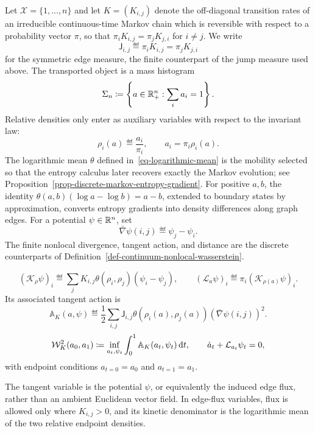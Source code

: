 Let \(\mathcal X=\{1,\ldots,n\}\) and let \(K=(K_{i,j})\) denote the off-diagonal transition rates of an irreducible continuous-time Markov chain which is reversible with respect to a probability vector \(\pi\), so that \(\pi_iK_{i,j}=\pi_jK_{j,i}\) for \(i\neq j\). We write
\[
	\mathsf J_{i,j}\eqdef \pi_iK_{i,j}=\pi_jK_{j,i}
\]
for the symmetric edge measure, the finite counterpart of the jump measure used above. The transported object is a mass histogram
\[
\Sigma_n\coloneqq\left\{a\in\mathbb{R}_+^n:\sum_i a_i=1\right\}.
\]
Relative densities only enter as auxiliary variables with respect to the invariant law:
\[
	\rho_i(a)\eqdef \frac{a_i}{\pi_i},
	\qquad a_i=\pi_i\rho_i(a).
\]
The logarithmic mean \(\theta\) defined in~\eqref{eq-logarithmic-mean} is the mobility selected so that the entropy calculus later recovers exactly the Markov evolution; see Proposition~\ref{prop-discrete-markov-entropy-gradient}. For positive $a,b$, the identity \(\theta(a,b)(\log a-\log b)=a-b\), extended to boundary states by approximation, converts entropy gradients into density differences along graph edges. For a potential \(\psi\in\mathbb{R}^n\), set
\[
	\bar\nabla\psi(i,j)\eqdef\psi_j-\psi_i.
\]
The finite nonlocal divergence, tangent action, and distance are the discrete counterparts of Definition~\ref{def-continuum-nonlocal-wasserstein}.
\begin{defn}\label{def-discrete-markov-wasserstein}
\begin{equation}
\label{eq-discrete-markov-onsager}
(\mathcal K_\rho\psi)_i
\eqdef
\sum_j K_{i,j}\theta(\rho_i,\rho_j)(\psi_i-\psi_j),
\qquad
(\mathcal L_a\psi)_i
\eqdef
\pi_i(\mathcal K_{\rho(a)}\psi)_i.
\end{equation}
Its associated tangent action is
\begin{equation}
\label{eq-discrete-markov-action}
\mathbb A_K(a,\psi)
\eqdef
\frac12\sum_{i,j}\mathsf J_{i,j}\theta(\rho_i(a),\rho_j(a))
(\bar\nabla\psi(i,j))^2.
\end{equation}
\begin{equation}
\label{eq-discrete-markov-distance}
\mathcal W_K^2(a_0,a_1)
\coloneqq
\inf_{a_t,\psi_t}
\int_0^1\mathbb A_K(a_t,\psi_t)\,\mathrm{d} t,
\qquad
\dot a_t+\mathcal L_{a_t}\psi_t=0,
\end{equation}
with endpoint conditions \(a_{t=0}=a_0\) and \(a_{t=1}=a_1\).
\end{defn}
The tangent variable is the potential \(\psi\), or equivalently the induced edge flux, rather than an ambient Euclidean vector field. In edge-flux variables, flux is allowed only where \(K_{i,j}>0\), and its kinetic denominator is the logarithmic mean of the two relative endpoint densities.

